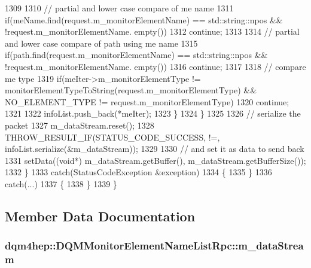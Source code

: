 \begin{DoxyCode}
1309 
1310         \textcolor{comment}{// partial and lower case compare of me name}
1311         \textcolor{keywordflow}{if}(meName.find(request.m\_monitorElementName) == std::string::npos && !request.m\_monitorElementName.
      empty())
1312           \textcolor{keywordflow}{continue};
1313 
1314         \textcolor{comment}{// partial and lower case compare of path using me name}
1315         \textcolor{keywordflow}{if}(path.find(request.m\_monitorElementName) == std::string::npos && !request.m\_monitorElementName.
      empty())
1316           \textcolor{keywordflow}{continue};
1317 
1318         \textcolor{comment}{// compare me type}
1319         \textcolor{keywordflow}{if}(meIter->m\_monitorElementType != monitorElementTypeToString(request.m\_monitorElementType) && 
      NO\_ELEMENT\_TYPE != request.m\_monitorElementType)
1320           \textcolor{keywordflow}{continue};
1321 
1322         infoList.push\_back(*meIter);
1323       \}
1324     \}
1325 
1326     \textcolor{comment}{// serialize the packet}
1327     m_dataStream.reset();
1328     THROW_RESULT_IF(STATUS\_CODE\_SUCCESS, !=, infoList.serialize(&m_dataStream));
1329 
1330     \textcolor{comment}{// and set it as data to send back}
1331     setData((\textcolor{keywordtype}{void}*) m_dataStream.getBuffer(), m_dataStream.getBufferSize());
1332   \}
1333   \textcolor{keywordflow}{catch}(StatusCodeException &exception)
1334   \{
1335   \}
1336   \textcolor{keywordflow}{catch}(...)
1337   \{
1338   \}
1339 \}
\end{DoxyCode}


\subsection{Member Data Documentation}
\subsubsection[{m\+\_\+data\+Stream}]{ dqm4hep\+::\+D\+Q\+M\+Monitor\+Element\+Name\+List\+Rpc\+::m\+\_\+data\+Stream\hspace{0.3cm}{\ttfamily [private]}}\label{classdqm4hep_1_1DQMMonitorElementNameListRpc_a99fcd147ccd5259589c14755554f319d}


